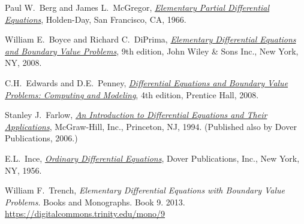 \documentclass[12pt]{book}
\begin{document}


\renewcommand{\bibname}{Further Reading}

\begin{thebibliography}{MM}


\label{furtherreading:chapter}

 Paul W.\ Berg and James L.\ McGregor, 
 \emph{\href{https://books.google.com/books?id=EfJQAAAAMAAJ}{Elementary
Partial Differential Equations}}, 
 Holden-Day,
 San Francisco, CA\@,
 1966.

 William E.\ Boyce and
 Richard C.\ DiPrima,
 \emph{\href{https://books.google.com/books?id=nYWcQgAACAAJ}{Elementary
Differential Equations and Boundary Value Problems}},
 9th edition,
 John Wiley \& Sons Inc.,
 New York, NY\@, 2008.

 C.H.\ Edwards and D.E.\ Penney,
 \emph{\href{https://books.google.com/books?id=qi6ePwAACAAJ}{Differential
Equations and Boundary Value Problems: Computing and Modeling}},
 4th edition,
 Prentice Hall,
 2008.

 Stanley J.\ Farlow,
 \emph{\href{https://books.google.com/books?id=_ozWAAAAMAAJ}{An Introduction
to Differential Equations and Their Applications}},
 McGraw-Hill, Inc.,
 Princeton, NJ\@,
 1994.  (Published also by Dover Publications, 2006.)

 E.L.\ Ince,
 \emph{\href{https://books.google.com/books?id=uYz-pqUD75gC}{Ordinary
Differential Equations}},
 Dover Publications, Inc.,
 New York, NY\@,
 1956.

 William F.\ Trench,
 \emph{Elementary Differential Equations with Boundary Value
Problems}. Books and Monographs. Book 9.  2013.
\url{https://digitalcommons.trinity.edu/mono/9}

\end{thebibliography}
\end{document}
